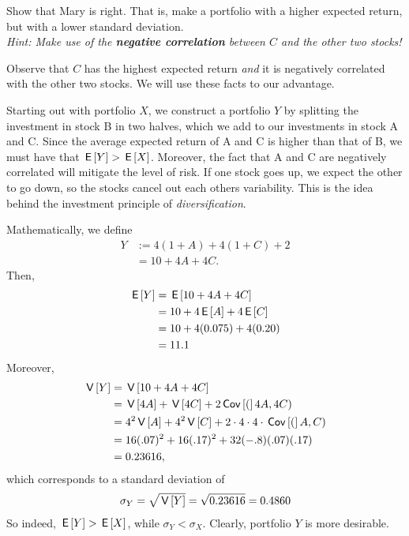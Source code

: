 \documentclass[lectures]{subfiles}
\begin{document}
\begin{exercise}
Show that Mary is right. That is, make a portfolio with a higher expected return, but with a lower standard deviation. \\
\textit{Hint: Make use of the \textbf{negative correlation} between $C$ and the other two stocks!}
\begin{solution}
Observe that $C$ has the highest expected return \textit{and} it is negatively correlated with the other two stocks. We will use these facts to our advantage.

Starting out with portfolio $X$, we construct a portfolio $Y$ by splitting the investment in stock B in two halves, which we add to our investments in stock A and C. Since the average expected return of A and C is higher than that of B, we must have that $\,\mathsf{E}\left[Y\right] > \,\mathsf{E}\left[X\right]$. Moreover, the fact that A and C are negatively correlated will mitigate the level of risk. If one stock goes up, we expect the other to go down, so the stocks cancel out each others variability. This is the idea behind the investment principle of \textit{diversification}.

Mathematically, we define
\begin{align}
    Y &:= 4(1 + A) + 4(1 + C) + 2 \\
    &= 10 + 4A + 4C.
\end{align}
Then,
\begin{align}
    \,\mathsf{E}\left[Y\right] &= \,\mathsf{E}\left[10 + 4A + 4C\right] \\
    &= 10 + 4\,\mathsf{E}\left[A\right] + 4\,\mathsf{E}\left[C\right] \\
    &= 10 + 4(0.075) + 4(0.20) \\
    &= 11.1
\end{align}
Moreover,
\begin{align}
    \,\mathsf{V}\left[Y\right] &= \,\mathsf{V}\left[10 + 4A + 4C\right] \\
    &= \,\mathsf{V}\left[4A\right] + \,\mathsf{V}\left[4C\right] + 2 \,\mathsf{Cov}\left[(\right]4A, 4C)\\
    &= 4^2\,\mathsf{V}\left[A\right] + 4^2 \,\mathsf{V}\left[C\right] +2 \cdot  4 \cdot 4 \cdot \,\mathsf{Cov}\left[(\right]A,C) \\
    &= 16 (.07)^2 + 16 (.17)^2  + 32 (-.8)(.07)(.17) \\
    &= 0.23616,
\end{align}
which corresponds to a standard deviation of
\begin{align}
    \sigma_Y = \sqrt{\,\mathsf{V}\left[Y\right]} = \sqrt{0.23616} = 0.4860
\end{align}
So indeed, $\,\mathsf{E}\left[Y\right] > \,\mathsf{E}\left[X\right]$, while $\sigma_Y < \sigma_X$. Clearly, portfolio $Y$ is more desirable.
\end{solution}
\end{exercise}
\end{document}
